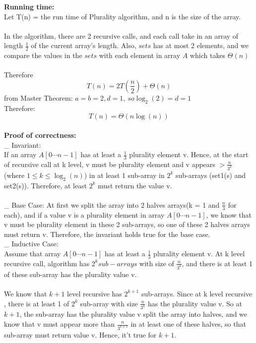 \documentclass[11pt]{article}
\newcommand{\tab}{\hspace*{2em}}
\begin{document}
\noindent
\textbf{Running time:}\\
Let T(n) = the run time of Plurality algorithm, and n is the size of the array.
\\\\
In the algorithm, there are 2 recursive calls, and each call take in an array of length $\frac{1}{2}$ of the current array's length. Also, $sets$ has at most 2 elements, and we compare the values in the $sets$ with each element in array $A$ which takes $\Theta(n)$\\
\\
Therefore
$$T(n) = 2T(\frac{n}{2}) + \Theta(n)$$
from Master Theorem: $a = b = 2, d = 1,\ so \log_2(2) = d = 1$\\
Therefore:
$$\boxed{T(n) = \Theta(n\log(n))}$$
\\
\noindent
\textbf{Proof of correctness:}\\
\_ Invariant: \\
\tab If an array $A[0\cdots n-1]$ has at least a $\frac{1}{3}$ plurality element v.
Hence, at the start of recursive call at k level, v must be plurality element and v appears $> \frac{n}{3^k}$\\ (where 
$1 \leqslant k \leqslant \log_2(n)$) in at least 1 sub-array in $2^k$ sub-arrays (set1(s) and set2(s)). Therefore, at least $2^k$ must return the value v.
\\
\\
\_ Base Case: At first we split the array into 2 halves arrays(k = 1 and $\frac{n}{3}$ for each), and if a value v is a plurality element in array $A[0\cdots n-1]$, we know that v must be plurality element in these 2 sub-arrays, so one of these 2 halves arrays must return v. Therefore, the invariant holds true for the base case.
\\
\_ Inductive Case:\\
Assume that array $A[0\cdots n-1]$ has at least a $\frac{1}{3}$ plurality element v. At k level recursive call, algorithm has $2^k sub-arrays $ with size of $\frac{n}{3^k}$, and there is at least 1 of these sub-array has the plurality value v.\\\\
We know that $k+1$ level recursive has $2^{k+1}$ sub-arrays. Since at k level recursive , there is at least 1 of $2^k$ sub-array with size $\frac{n}{3^k}$ has the plurality value v. So at $k+1$, the sub-array has the plurality value v split the array into halves, and we know that v must appear more than $\frac{n}{3^{k+1}}$ in at least one of these halves, so that sub-array must return value v. Hence, it't true for $k+1$.\\
\end{document}
